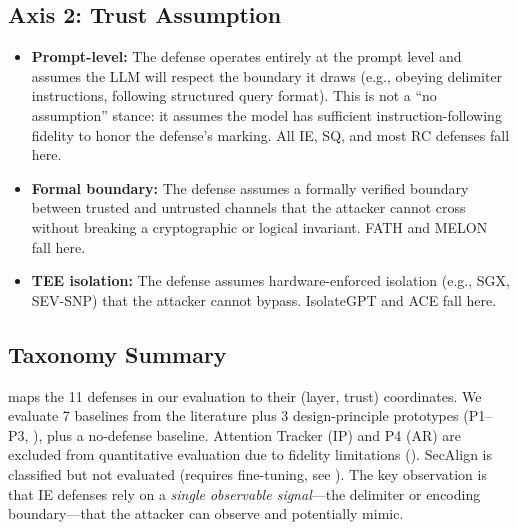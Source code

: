 \subsection{Axis 2: Trust Assumption}

\begin{itemize}[noitemsep,topsep=0pt]
\item \textbf{Prompt-level:} The defense operates entirely at the prompt level and assumes the LLM will respect the boundary it draws (e.g., obeying delimiter instructions, following structured query format). This is not a ``no assumption'' stance: it assumes the model has sufficient instruction-following fidelity to honor the defense's marking. All IE, SQ, and most RC defenses fall here.
\item \textbf{Formal boundary:} The defense assumes a formally verified boundary between trusted and untrusted channels that the attacker cannot cross without breaking a cryptographic or logical invariant. FATH and MELON~\cite{zhu2025melon} fall here.
\item \textbf{TEE isolation:} The defense assumes hardware-enforced isolation (e.g., SGX, SEV-SNP) that the attacker cannot bypass. IsolateGPT and ACE fall here.
\end{itemize}

\subsection{Taxonomy Summary}

 maps the 11 defenses in our evaluation to their (layer, trust) coordinates. We evaluate 7 baselines from the literature plus 3 design-principle prototypes (P1--P3, ), plus a no-defense baseline. Attention Tracker (IP) and P4 (AR) are excluded from quantitative evaluation due to fidelity limitations (). SecAlign is classified but not evaluated (requires fine-tuning, see ). The key observation is that IE defenses rely on a \emph{single observable signal}---the delimiter or encoding boundary---that the attacker can observe and potentially mimic.

